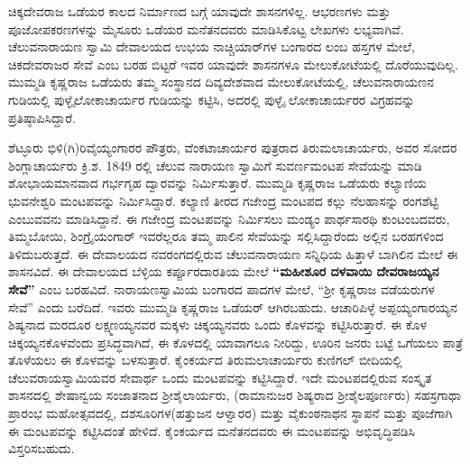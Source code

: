 ಚಿಕ್ಕದೇವರಾಜ ಒಡೆಯರ ಕಾಲದ ನಿರ್ಮಾಣದ ಬಗ್ಗೆ ಯಾವುದೇ ಶಾಸನಗಳಿಲ್ಲ. ಆಭರಣಗಳು ಮತ್ತು ಪೂಜೋಪಕರಣಗಳನ್ನು ಮೈಸೂರು ಒಡೆಯರ ಮನೆತನದವರು ಮಾಡಿಸಿಕೊಟ್ಟ ಲೇಖಗಳು ಲಭ್ಯವಾಗಿವೆ. ಚೆಲುವನಾರಾಯಣ ಸ್ವಾಮಿ ದೇವಾಲಯದ ಉಭಯ ನಾಚ್ಚಿಯಾರ್​ಗಳ ಬಂಗಾರದ ಲಂಬ ಹಸ್ತಗಳ ಮೇಲೆ, ಚಿಕದೇವರಾಜರ ಸೇವೆ ಎಂಬ ಬರಹ ಬಿಟ್ಟರೆ ಇವರ ಯಾವುದೇ ಶಾಸನಗಳೂ ಮೇಲುಕೋಟೆಯಲ್ಲಿ ದೊರೆಯುವುದಿಲ್ಲ. ಮುಮ್ಮಡಿ ಕೃಷ್ಣರಾಜ ಒಡೆಯರು ತಮ್ಮ ಸಂಸ್ಥಾನದ ದಿವ್ಯದೇಶವಾದ ಮೇಲುಕೋಟೆಯಲ್ಲಿ, ಚೆಲುವನಾರಾಯಣನ ಗುಡಿಯಲ್ಲಿ ಪುಳ್ಳೈಲೋಕಾಚಾರ್ಯರ ಗುಡಿಯನ್ನು ಕಟ್ಟಿಸಿ, ಅದರಲ್ಲಿ ಪುಳ್ಳೈ ಲೋಕಾಚಾರ್ಯರರ ವಿಗ್ರಹವನ್ನು ಪ್ರತಿಷ್ಠಾಪಿಸಿದ್ದಾರೆ.

ಶೆಟ್ಳೂರು ಭಿಳಿ(ಗಿ)ರಿವೈಯ್ಯಂಗಾರರ ಪೌತ್ರರು, ವೆಂಕಟಾಚಾರ್ಯರ ಪುತ್ರರಾದ ತಿರುಮಲಾಚಾರ್ಯರು, ಅವರ ಸೋದರ ಶಿಂಗ್ಲಾಚಾರ್ಯರು ಕ್ರಿ.ಶ. 1849 ರಲ್ಲಿ ಚೆಲುವ ನಾರಾಯಣ ಸ್ವಾಮಿಗೆ ಸುವರ್ಣಮಂಟಪ ಸೇವೆಯನ್ನು ಮಾಡಿ ಶೋಭಾಯಮಾನವಾದ ಗರ್ಭಗೃಹ ದ್ವಾರವನ್ನು ನಿರ್ಮಿಸುತ್ತಾರೆ. ಮುಮ್ಮಡಿ ಕೃಷ್ಣರಾಜ ಒಡೆಯರು ಕಲ್ಯಾಣಿಯ ಭುವನೇಶ್ವರಿ ಮಂಟಪವನ್ನು ನಿರ್ಮಿಸಿದ್ದಾರೆ. ಕಲ್ಯಾಣಿ ತೀರದ ಗಜೇಂದ್ರ ಮಂಟಪದ ಕಲ್ಲು ನೆಲಹಾಸನ್ನು ರಂಗಶೆಟ್ಟಿ ಎಂಬುವವನು ಮಾಡಿಸಿದ್ದಾನೆ. ಈ ಗಜೇಂದ್ರ ಮಂಟಪವನ್ನು ನಿರ್ಮಿಸಲು ಮಂಡ್ಯಂ ಪಾರ್ಥಸಾರಥಿ ಕುಂಟಂಬದವರು, ತಿಮ್ಮಬೋಯಿ, ಶಿಂಗ್ರೈಯಂಗಾರ್​ ಇವರೆಲ್ಲರೂ ತಮ್ಮ ಪಾಲಿನ ಸೇವೆಯನ್ನು ಸಲ್ಲಿಸಿದ್ದಾರೆಂದು ಅಲ್ಲಿನ ಬರಹಗಳಿಂದ ತಿಳಿದುಬರುತ್ತದೆ. ಈ ದೇವಾಲಯದ ನವರಂಗದಲ್ಲಿರುವ ಚೆಲುವನಾರಾಯಣ ಸನ್ನಿಧಿಯ ಹಿತ್ತಾಳೆ ಬಾಗಿಲಿನ ಮೇಲೆ ಈ ಶಾಸನವಿದೆ. ಈ ದೇವಾಲಯದ ಬೆಳ್ಳಿಯ ಕರ್ಪ್ಪೂರದಾರತಿಯ ಮೇಲೆ \textbf{“ಮಹೀಶೂರ ದಳವಾಯಿ ದೇವರಾಜಯ್ಯನ ಸೇವೆ”} ಎಂಬ ಬರಹವಿದೆ. ನಾರಾಯಣಸ್ವಾಮಿಯ ಬಂಗಾರದ ಪಾದಗಳ ಮೇಲೆ, “ಶ‍್ರೀ ಕೃಷ್ಣರಾಜ ವಡೆಯರುಗಳ ಸೇವೆ” ಎಂದು ಬರೆದಿದೆ. ಇವರು ಮುಮ್ಮಡಿ ಕೃಷ್ಣರಾಜ ಒಡೆಯರ್​ ಆಗಿರಬಹುದು. ಆಚಾರಿಪಿಳ್ಳೆ ಅಪ್ಪಯ್ಯಂಗಾರಯ್ಯನ ಶಿಷ್ಯನಾದ ಮರದೂರ ಲಕ್ಷ್ಮಣಯ್ಯನವರ ಮಕ್ಕಳು ಚಿಕ್ಕಯ್ಯನವರು ಒಂದು ಕೊಳವನ್ನು ಕಟ್ಟಿಸಿರುತ್ತಾರೆ. ಈ ಕೊಳ ಚಿಕ್ಕಯ್ಯನಕೊಳವೆಂದು ಪ್ರಸಿದ್ಧವಾಗಿದೆ, ಈ ಕೊಳದಲ್ಲಿ ಯಾವಾಗಲೂ ನೀರಿದ್ದು, ಊರಿನ ಜನರು ಬಟ್ಟೆ ಒಗೆಯಲು ಪಾತ್ರೆ ತೊಳೆಯಲು ಈ ಕೊಳವನ್ನು ಬಳಸುತ್ತಾರೆ. ಕೈಂಕರ್ಯದ ತಿರುಮಲಾಚಾರ್ಯರು ಕುಣಿಗಲ್​ ಬೀದಿಯಲ್ಲಿ ಚೆಲುವರಾಯಸ್ವಾಮಿಯವರ ಸೇವಾರ್ಥ ಒಂದು ಮಂಟಪವನ್ನು ಕಟ್ಟಿಸಿದ್ದಾರೆ. ಇದೇ ಮಂಟಪದಲ್ಲಿರುವ ಸಂಸ್ಕೃತ ಶಾಸನದಲ್ಲಿ ಶೇಷಾನ್ವಯ ಸಂಜಾತನಾದ ಶ‍್ರೀಶೈಲಾರ್ಯರು, (ರಾಮಾನುಜರ ಶಿಷ್ಯರಾದ ಶ‍್ರೀಶೈಲಪೂರ್ಣರು) ಸಹಸ್ರಗಾಥಾ ಪ್ರಾರಂಭ ಮಹೋತ್ಸವದಲ್ಲಿ, ದಶಸೂರಿಗಳ(ಹತ್ತುಜನ ಆಳ್ವಾರರ) ಮತ್ತು ವೈಕುಂಠನಾಥನ ಸ್ಥಾಪನೆ ಮತ್ತು ಪೂಜೆಗಾಗಿ ಈ ಮಂಟಪವನ್ನು ಕಟ್ಟಿಸಿದಂತೆ ಹೇಳಿದೆ. ಕೈಂಕರ್ಯದ ಮನೆತನದವರು ಈ ಮಂಟಪವನ್ನು ಅಭಿವೃದ್ಧಿಪಡಿಸಿ ವಿಸ್ತರಿಸಬಹುದು.

